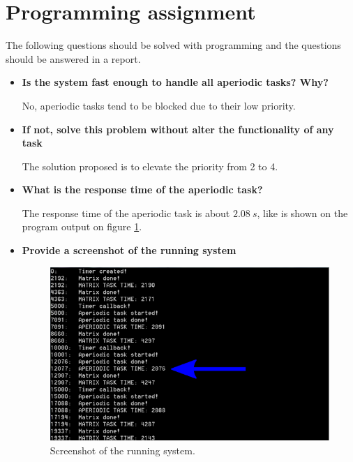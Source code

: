 \documentclass[12pt]{article}
\begin{document}
\section{Programming assignment}

The following questions should be solved with programming and the questions should be answered in a report.

\begin{itemize}
\item \textbf{Is the system fast enough to handle all aperiodic tasks? Why?}

No, aperiodic tasks tend to be blocked due to their low priority.

\item \textbf{If not, solve this problem without alter the functionality of any task}

The solution proposed is to elevate the priority from 2 to 4.

\item \textbf{What is the response time of the aperiodic task?}

The response time of the aperiodic task is about $2.08\ s$, like is shown on the program output on figure \ref{output}.

\item \textbf{Provide a screenshot of the running system}

\begin{figure}[h]
\centering
\includegraphics[scale=1]{figures/output}   
\caption{Screenshot of the running system.}
\label{output}
\end{figure}
\FloatBarrier

\end{itemize}
      
\end{document}
